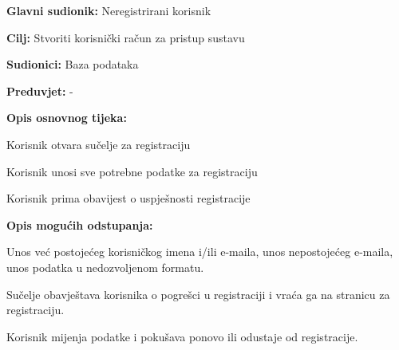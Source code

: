 					\noindent {}
					\begin{packed_item}
	
						\item \textbf{Glavni sudionik: } Neregistrirani korisnik
						\item  \textbf{Cilj: } Stvoriti korisnički račun za pristup sustavu
						\item  \textbf{Sudionici: } Baza podataka
						\item  \textbf{Preduvjet: } -
						\item  \textbf{Opis osnovnog tijeka:}
						
						\item[] \begin{packed_enum}
	
							\item Korisnik otvara sučelje za registraciju
							\item Korisnik unosi sve potrebne podatke za registraciju
							\item Korisnik prima obavijest o uspješnosti registracije
							
						\end{packed_enum}
						
						\item  \textbf{Opis mogućih odstupanja:}
						
						\item[] \begin{packed_item}
	
							\item[2.a] Unos već postojećeg korisničkog imena i/ili e-maila, unos nepostojećeg e-maila, unos podatka u nedozvoljenom formatu.
							\item[] \begin{packed_enum}
								
								\item Sučelje obavještava korisnika o pogrešci u registraciji i vraća ga na stranicu za registraciju.
								\item Korisnik mijenja podatke i pokušava ponovo ili odustaje od registracije.
								
							\end{packed_enum}
							
						\end{packed_item}
					\end{packed_item}
					
					\eject

